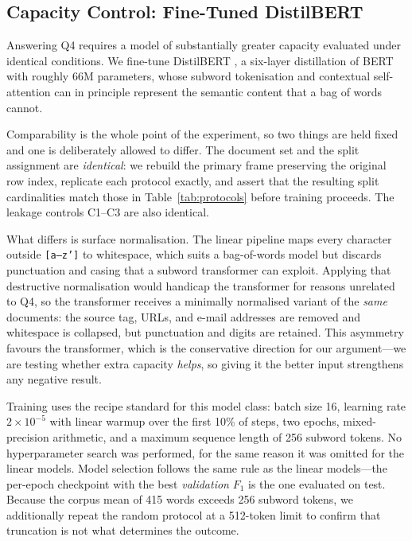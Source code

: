 \documentclass[conference]{IEEEtran}
\newcommand{\Fone}{$F_1$}
\begin{document}
\subsection{Capacity Control: Fine-Tuned DistilBERT}
\label{sec:method-transformer}
Answering Q4 requires a model of substantially greater capacity evaluated under
identical conditions. We fine-tune DistilBERT \cite{sanh2019distilbert}, a
six-layer distillation of BERT \cite{devlin2019bert} with roughly 66M
parameters, whose subword tokenisation and contextual self-attention
\cite{vaswani2017attention} can in principle represent the semantic content that
a bag of words cannot.

Comparability is the whole point of the experiment, so two things are held
fixed and one is deliberately allowed to differ. The document set and the split
assignment are \emph{identical}: we rebuild the primary frame preserving the
original row index, replicate each protocol exactly, and assert that the
resulting split cardinalities match those in Table~\ref{tab:protocols} before
training proceeds. The leakage controls C1--C3 are also identical.

What differs is surface normalisation. The linear pipeline maps every character
outside \texttt{[a--z']} to whitespace, which suits a bag-of-words model but
discards punctuation and casing that a subword transformer can exploit. Applying
that destructive normalisation would handicap the transformer for reasons
unrelated to Q4, so the transformer receives a minimally normalised variant of
the \emph{same} documents: the source tag, URLs, and e-mail addresses are
removed and whitespace is collapsed, but punctuation and digits are retained.
This asymmetry favours the transformer, which is the conservative direction for
our argument---we are testing whether extra capacity \emph{helps}, so giving it
the better input strengthens any negative result.

Training uses the recipe standard for this model class: batch size 16, learning
rate $2\times10^{-5}$ with linear warmup over the first 10\% of steps, two
epochs, mixed-precision arithmetic, and a maximum sequence length of 256 subword
tokens. No hyperparameter search was performed, for the same reason it was
omitted for the linear models. Model selection follows the same rule as
the linear models---the per-epoch checkpoint with the best \emph{validation}
\Fone{} is the one evaluated on test. Because the corpus mean of 415 words
exceeds 256 subword tokens, we additionally repeat the random protocol at a
512-token limit to confirm that truncation is not what determines the outcome.
\end{document}
